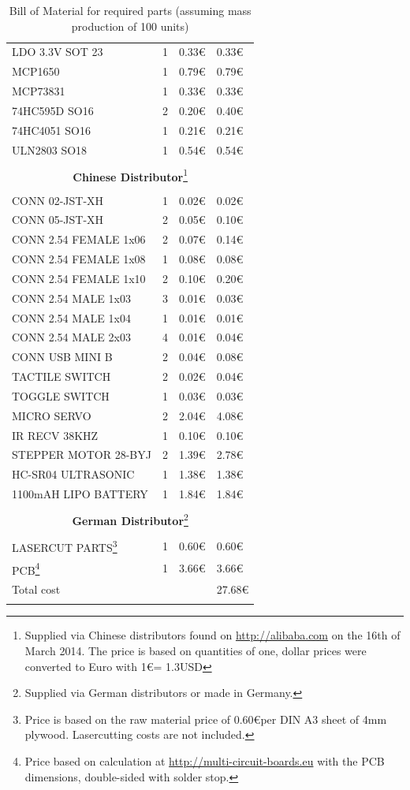 \documentclass[11pt,a4paper]{article}
\begin{document}
\begin{longtable}{p{}p{}p{}p{}}
LDO 3.3V SOT 23 & 1 & 0.33\euro & 0.33\euro \\ 
MCP1650 & 1 & 0.79\euro & 0.79\euro \\
MCP73831 & 1 & 0.33\euro & 0.33\euro \\
74HC595D SO16 & 2 & 0.20\euro & 0.40\euro \\
74HC4051 SO16 & 1 & 0.21\euro & 0.21\euro \\
ULN2803 SO18 & 1 & 0.54\euro & 0.54\euro \\
\\
\multicolumn{4}{c}{\textbf{Chinese Distributor}\footnote{\label{edragon}Supplied via Chinese distributors found on \url{http://alibaba.com} on the 16th of March 2014. The price is based on quantities of one, dollar prices were converted to Euro with 1\euro = 1.3USD }}\\
\\
CONN 02-JST-XH & 1 & 0.02\euro & 0.02\euro \\
CONN 05-JST-XH & 2 & 0.05\euro & 0.10\euro \\
CONN 2.54 FEMALE 1x06 & 2 & 0.07\euro & 0.14\euro \\
CONN 2.54 FEMALE 1x08 & 1 & 0.08\euro & 0.08\euro \\
CONN 2.54 FEMALE 1x10 & 2 & 0.10\euro & 0.20\euro \\
CONN 2.54 MALE 1x03 & 3 & 0.01\euro & 0.03\euro \\
CONN 2.54 MALE 1x04 & 1 & 0.01\euro & 0.01\euro \\
CONN 2.54 MALE 2x03 & 4 & 0.01\euro & 0.04\euro \\
CONN USB MINI B & 2 & 0.04\euro & 0.08\euro \\
TACTILE SWITCH & 2 & 0.02\euro & 0.04\euro \\
TOGGLE SWITCH & 1 & 0.03\euro & 0.03\euro \\
MICRO SERVO & 2 & 2.04\euro & 4.08\euro \\
IR RECV 38KHZ & 1 & 0.10\euro & 0.10\euro \\
STEPPER MOTOR 28-BYJ & 2 & 1.39\euro & 2.78\euro \\
HC-SR04 ULTRASONIC & 1 & 1.38\euro & 1.38\euro \\
1100mAH LIPO BATTERY & 1 & 1.84\euro & 1.84\euro \\
\\
\multicolumn{4}{c}{\textbf{German Distributor}\footnote{Supplied via German distributors or made in Germany.}}\\
\\
LASERCUT PARTS\footnote{Price is based on the raw material price of 0.60\euro per DIN A3 sheet of 4mm plywood. Lasercutting costs are not included. } & 1 & 0.60\euro & 0.60\euro \\
PCB\footnote{Price based on calculation at \url{http://multi-circuit-boards.eu} with the PCB dimensions, double-sided with solder stop.} & 1 & 3.66\euro & 3.66\euro \\ \hline\hline
Total cost& & & 27.68\euro \\
\bottomrule
\caption{Bill of Material for required parts (assuming mass production of 100 units)}
\label{tbl:bom}
\end{longtable}
\end{document}
